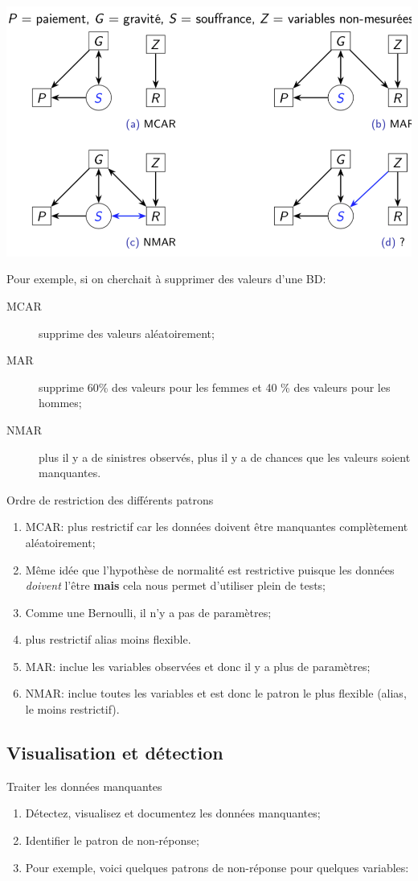 \documentclass[10pt, french]{article}
\begin{document}
\begin{multicols*}{3}
\includegraphics[scale=0.2]{src/ACT-3114/data-schema-missing.png}

Pour exemple, si on cherchait à supprimer des valeurs d'une BD:
\begin{description}
	\item[MCAR]	supprime des valeurs aléatoirement;
	\item[MAR]	supprime 60\% des valeurs pour les femmes et 40 \% des valeurs pour les hommes;
	\item[NMAR]	plus il y a de sinistres observés, plus il y a de chances que les valeurs soient manquantes.
\end{description}

Ordre de restriction des différents patrons
\begin{enumerate}
	\item	MCAR: plus \og restrictif \fg{} car les données doivent être manquantes complètement aléatoirement;
	\item[]	Même idée que l'hypothèse de normalité est restrictive puisque les données \textit{doivent} l'être \textbf{mais} cela nous permet d'utiliser plein de tests;
	\item[]	Comme une Bernoulli, il n'y a pas de paramètres;
	\item[]	plus restrictif alias moins flexible.
	\item	MAR: inclue les variables observées et donc il y a plus de paramètres;
	\item	NMAR: inclue toutes les variables et est donc le patron le plus flexible (alias, le moins restrictif).
\end{enumerate}

\subsection*{Visualisation et détection}
\begin{algo}{Traiter les données manquantes}
\begin{enumerate}
	\item	Détectez, visualisez et documentez les données manquantes;
	\item	Identifier le patron de non-réponse;
	\item[]	Pour exemple, voici quelques patrons de non-réponse pour quelques variables:


\end{enumerate}
\end{algo}
\end{multicols*}
\end{document}
